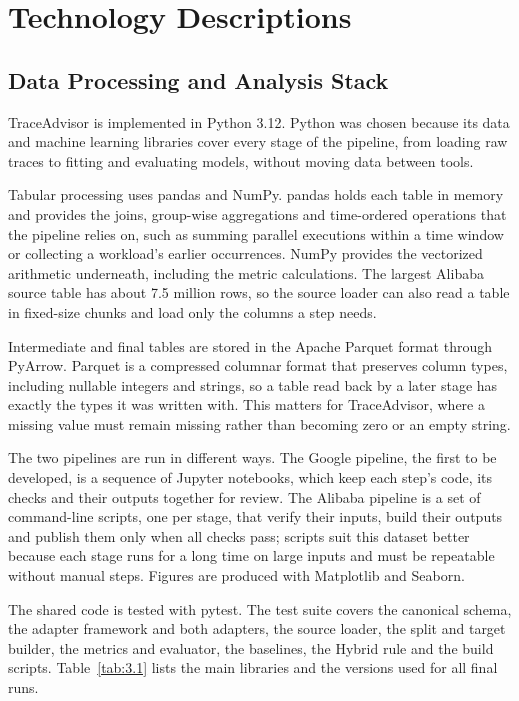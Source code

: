 \section{Technology Descriptions}\label{sec:3}

\subsection{Data Processing and Analysis Stack}\label{sec:3.1}

TraceAdvisor is implemented in Python 3.12. Python was chosen because its data and machine learning libraries cover every stage of the pipeline, from loading raw traces to fitting and evaluating models, without moving data between tools.

Tabular processing uses pandas and NumPy. pandas holds each table in memory and provides the joins, group-wise aggregations and time-ordered operations that the pipeline relies on, such as summing parallel executions within a time window or collecting a workload's earlier occurrences. NumPy provides the vectorized arithmetic underneath, including the metric calculations. The largest Alibaba source table has about 7.5 million rows, so the source loader can also read a table in fixed-size chunks and load only the columns a step needs.

Intermediate and final tables are stored in the Apache Parquet format through PyArrow. Parquet is a compressed columnar format that preserves column types, including nullable integers and strings, so a table read back by a later stage has exactly the types it was written with. This matters for TraceAdvisor, where a missing value must remain missing rather than becoming zero or an empty string.

The two pipelines are run in different ways. The Google pipeline, the first to be developed, is a sequence of Jupyter notebooks, which keep each step's code, its checks and their outputs together for review. The Alibaba pipeline is a set of command-line scripts, one per stage, that verify their inputs, build their outputs and publish them only when all checks pass; scripts suit this dataset better because each stage runs for a long time on large inputs and must be repeatable without manual steps. Figures are produced with Matplotlib and Seaborn.

The shared code is tested with pytest. The test suite covers the canonical schema, the adapter framework and both adapters, the source loader, the split and target builder, the metrics and evaluator, the baselines, the Hybrid rule and the build scripts. Table~\ref{tab:3.1} lists the main libraries and the versions used for all final runs.

